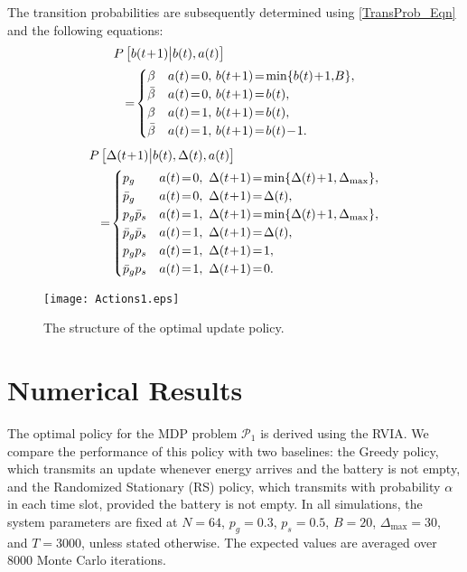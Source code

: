 \documentclass[lettersize,journal]{IEEEtran}
\begin{document}
	The transition probabilities are subsequently determined using \eqref{TransProb_Eqn} and the following equations:
	\begin{align}
		P&\left[b(t\!+\!1)\big|b(t),a(t)\right] \\
        &\!=\! 
		\begin{cases}
			\beta & a(t)\!=\!0,\!\  b(t\!+\!1)\!=\!\min \!\left\{b(t)\!+\!1,\!B \right\}\!,\\
			\bar{\beta} & a(t)\!=\!0,\!\  b(t\!+\!1)\!=\!b(t),\\
			\beta & a(t)\!=\!1,\!\  b(t\!+\!1)\!=\!b(t),\\
			\bar{\beta} & a(t)\!=\!1,\!\  b(t\!+\!1)\!=\!b(t)\!-\!1.
		\end{cases} \notag
	\end{align}
	\begin{align}
		P&\left[\Delta(t\!+\!1) \big|b(t),\Delta(t),a(t)\right] \\
		&\!=\! 
		\begin{cases}
			p_g & a(t)\!=\!0,\  \Delta(t\!+\!1)\!=\!\min \{\Delta(t)\!+\!1,\Delta_{\text{max}} \},\\
			\bar{p}_g & a(t)\!=\!0,\  \Delta(t\!+\!1)\!=\!\Delta(t),\\
			p_g\bar{p}_s & a(t)\!=\!1,\  \Delta(t\!+\!1)\!=\!\min \{\Delta(t)\!+\!1,\Delta_{\text{max}} \},\\
			\bar{p}_g\bar{p}_s & a(t)\!=\!1,\  \Delta(t\!+\!1)\!=\!\Delta(t),\\
			p_gp_s & a(t)\!=\!1,\  \Delta(t\!+\!1)\!=\!1,\\
			\bar{p}_gp_s & a(t)\!=\!1,\  \Delta(t\!+\!1)\!=\!0.
		\end{cases} \notag
	\end{align}

    \begin{figure}[tb!]
		\centering
		\texttt{[image: Actions1.eps]}
		\caption{The structure of the optimal update policy.}
        \vspace{-8pt}
		\label{fig_OptimalActions}
    \end{figure}

    \section{Numerical Results}
    The optimal policy for the MDP problem $\mathcal{P}_1$ is derived using the RVIA. We compare the performance of this policy with two baselines: the Greedy policy, which transmits an update whenever energy arrives and the battery is not empty, and the Randomized Stationary (RS) policy, which transmits with probability $\alpha$ in each time slot, provided the battery is not empty. In all simulations, the system parameters are fixed at $N=64$, $p_g = 0.3$, $p_s = 0.5$, $B = 20$, $\Delta_{\text{max}} = 30$, and $T=3000$, unless stated otherwise. The expected values are averaged over $8000$ Monte Carlo iterations.
\end{document}
